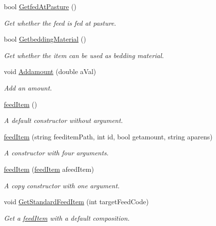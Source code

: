 \begin{DoxyCompactItemize}
bool \mbox{\hyperlink{classfeed_item_a2ac9193880ba846aa5d36a440b403dd2}{Getfed\+At\+Pasture}} ()
\begin{DoxyCompactList}\small\item\em Get whether the feed is fed at pasture. \end{DoxyCompactList}\item 
bool \mbox{\hyperlink{classfeed_item_a0c317f7da87544acbc40bde36f78dd76}{Getbedding\+Material}} ()
\begin{DoxyCompactList}\small\item\em Get whether the item can be used as bedding material. \end{DoxyCompactList}\item 
void \mbox{\hyperlink{classfeed_item_a7b662aa8b1ac382a6c2e27e45ca486bd}{Addamount}} (double a\+Val)
\begin{DoxyCompactList}\small\item\em Add an amount. \end{DoxyCompactList}\item 
\mbox{\hyperlink{classfeed_item_a724ed9b301bf4696a844e92b6bd49980}{feed\+Item}} ()
\begin{DoxyCompactList}\small\item\em A default constructor without argument. \end{DoxyCompactList}\item 
\mbox{\hyperlink{classfeed_item_ac121aceac1fceb9849bdd8f8ddbb843f}{feed\+Item}} (string feeditem\+Path, int id, bool getamount, string aparens)
\begin{DoxyCompactList}\small\item\em A constructor with four arguments. \end{DoxyCompactList}\item 
\mbox{\hyperlink{classfeed_item_a949d4268d916d82df8bfd9c59e348410}{feed\+Item}} (\mbox{\hyperlink{classfeed_item}{feed\+Item}} afeed\+Item)
\begin{DoxyCompactList}\small\item\em A copy constructor with one argument. \end{DoxyCompactList}\item 
void \mbox{\hyperlink{classfeed_item_aa72ab2d2d970e988b2f739e0abccf031}{Get\+Standard\+Feed\+Item}} (int target\+Feed\+Code)
\begin{DoxyCompactList}\small\item\em Get a \mbox{\hyperlink{classfeed_item}{feed\+Item}} with a default composition. \end{DoxyCompactList}\item 

\end{DoxyCompactItemize}
